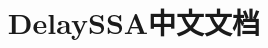 \documentclass[twoside, doctor, openany]{ecust_thesis}
\theoremstyle{definition}
\begin{document}

\title{DelaySSA中文文档}

% 
% 
% 
% 
% 
% 
% 
% 
% 

\frontmatter



\tableofcontents
\cleardoublepage %


\mainmatter


% 
% 
% 




\appendix
\renewcommand\theequation{\Alph{chapter}--\arabic{equation}}  %
\renewcommand\thefigure{\Alph{chapter}--\arabic{figure}}
\renewcommand\thetable{\Alph{chapter}--\arabic{table}}
%

\backmatter

% 


% 
\end{document}
